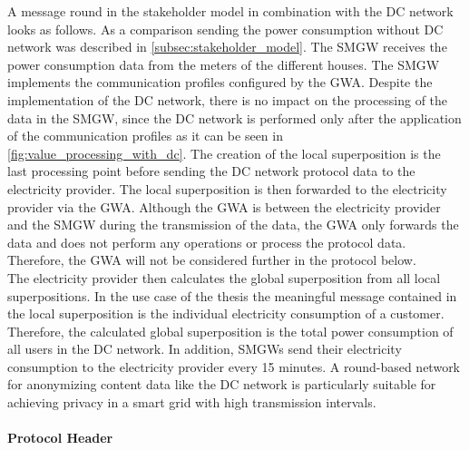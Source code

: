 A message round in the stakeholder model in combination with the DC network looks as follows. As a comparison sending the power consumption without DC network was described in \ref{subsec:stakeholder_model}. The \gls{SMGW} receives the power consumption data from the meters of the different houses. The \gls{SMGW} implements the communication profiles configured by the \gls{GWA}. Despite the implementation of the DC network, there is no impact on the processing of the data in the \gls{SMGW}, since the DC network is performed only after the application of the communication profiles as it can be seen in \ref{fig:value_processing_with_dc}. The creation of the local superposition is the last processing point before sending the DC network protocol data to the electricity provider. The local superposition is then forwarded to the electricity provider via the \gls{GWA}. Although the \gls{GWA} is between the electricity provider and the \gls{SMGW} during the transmission of the data, the \gls{GWA} only forwards the data and does not perform any operations or process the protocol data. Therefore, the \gls{GWA} will not be considered further in the protocol below.\\ The electricity provider then calculates the global superposition from all local superpositions. In the use case of the thesis the meaningful message contained in the local superposition is the individual electricity consumption of a customer. Therefore, the calculated global superposition is the total power consumption of all users in the DC network. In addition, \gls{SMGW}s send their electricity consumption to the electricity provider every 15 minutes. A round-based network for anonymizing content data like the DC network is particularly suitable for achieving privacy in a smart grid with high transmission intervals.
\\
\\
\textbf{Protocol Header}
